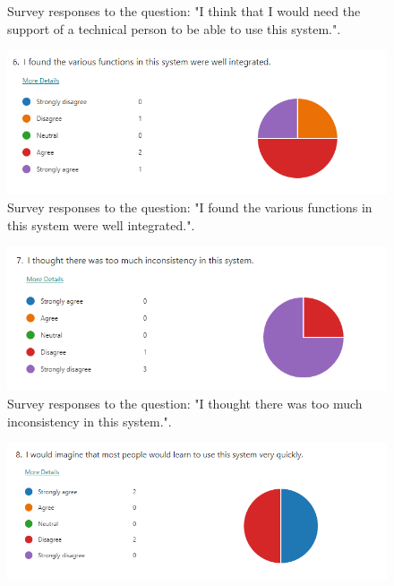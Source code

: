 \documentclass{l4proj}
\begin{document}
\begin{appendices}
\begin{figure}[h]
    \caption{Survey responses to the question: "I think that I would need the support of a technical person to be able to use this system.".}
    \label{fig:usability4} 
\end{figure}

\begin{figure}[h]
    \centering
    \includegraphics[width=0.9\linewidth]{images/usability5.png}    

    \caption{Survey responses to the question: "I found the various functions in this system were well integrated.".}
    \label{fig:usability5} 
\end{figure}

\begin{figure}[h]
    \centering
    \includegraphics[width=0.9\linewidth]{images/usability6.png}    

    \caption{Survey responses to the question: "I thought there was too much inconsistency in this system.".}
    \label{fig:usability6} 
\end{figure}

\begin{figure}[h]
    \centering
    \includegraphics[width=0.9\linewidth]{images/usability7.png}    


\end{figure}
\end{appendices}
\end{document}
